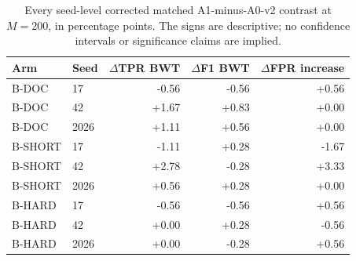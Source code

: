 \begin{table}[t]
\caption{Every seed-level corrected matched A1-minus-A0-v2 contrast at $M=200$, in percentage points. The signs are descriptive; no confidence intervals or significance claims are implied.}
\label{tab:r3-class-balance-seeds}

\centering
\small
\setlength{\tabcolsep}{4pt}
\begin{tabular}{@{}llrrr@{}}
\toprule
Arm & Seed & $\Delta$TPR BWT & $\Delta$F1 BWT & $\Delta$FPR increase \\
\midrule
B-DOC & 17 & -0.56 & -0.56 & +0.56 \\
B-DOC & 42 & +1.67 & +0.83 & +0.00 \\
B-DOC & 2026 & +1.11 & +0.56 & +0.00 \\
B-SHORT & 17 & -1.11 & +0.28 & -1.67 \\
B-SHORT & 42 & +2.78 & -0.28 & +3.33 \\
B-SHORT & 2026 & +0.56 & +0.28 & +0.00 \\
B-HARD & 17 & -0.56 & -0.56 & +0.56 \\
B-HARD & 42 & +0.00 & +0.28 & -0.56 \\
B-HARD & 2026 & +0.00 & -0.28 & +0.56 \\
\bottomrule
\end{tabular}


\end{table}
